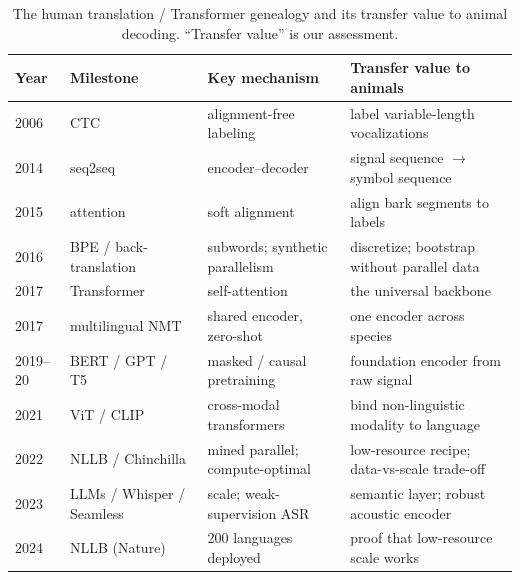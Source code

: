 \begin{table}[htbp]
\centering
\caption{The human translation / Transformer genealogy and its transfer
value to animal decoding. ``Transfer value'' is our assessment.}
\label{tab:genealogy}
\footnotesize
\setlength{\tabcolsep}{4pt}
\begin{tabular}{@{}p{0.8cm}p{3.4cm}p{3.4cm}p{5.6cm}@{}}
\toprule
\textbf{Year} & \textbf{Milestone} & \textbf{Key mechanism} & \textbf{Transfer value to animals} \\
\midrule
2006 & CTC~\cite{graves2006ctc} & alignment-free labeling & label variable-length vocalizations \\
2014 & seq2seq~\cite{sutskever2014seq2seq,cho2014rnn} & encoder--decoder & signal sequence $\to$ symbol sequence \\
2015 & attention~\cite{bahdanau2015attention} & soft alignment & align bark segments to labels \\
2016 & BPE / back-translation~\cite{sennrich2016bpe,sennrich2016improving} & subwords; synthetic parallelism & discretize; bootstrap without parallel data \\
2017 & Transformer~\cite{vaswani2017attention} & self-attention & the universal backbone \\
2017 & multilingual NMT~\cite{johnson2017multilingual} & shared encoder, zero-shot & one encoder across species \\
2019--20 & BERT / GPT / T5~\cite{devlin2019bert,brown2020gpt3,raffel2020t5} & masked / causal pretraining & foundation encoder from raw signal \\
2021 & ViT / CLIP~\cite{dosovitskiy2021vit,radford2021clip} & cross-modal transformers & bind non-linguistic modality to language \\
2022 & NLLB / Chinchilla~\cite{costajussa2022nllb,hoffmann2022chinchilla} & mined parallel; compute-optimal & low-resource recipe; data-vs-scale trade-off \\
2023 & LLMs / Whisper / Seamless~\cite{openai2023gpt4,radford2023whisper,seamless2023m4t} & scale; weak-supervision ASR & semantic layer; robust acoustic encoder \\
2024 & NLLB (Nature)~\cite{nllb2024scaling} & 200 languages deployed & proof that low-resource scale works \\
\bottomrule
\end{tabular}
\end{table}

